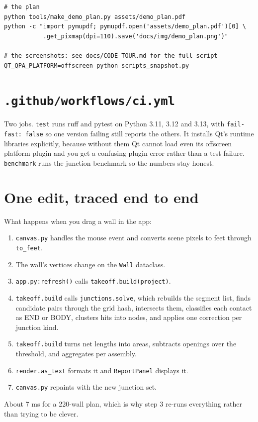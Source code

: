 \documentclass[11pt,letterpaper]{article}
\newcommand{\code}[1]{\texttt{\small #1}}
\begin{document}
\begin{lstlisting}[language=none]
# the plan
python tools/make_demo_plan.py assets/demo_plan.pdf
python -c "import pymupdf; pymupdf.open('assets/demo_plan.pdf')[0] \
           .get_pixmap(dpi=110).save('docs/img/demo_plan.png')"

# the screenshots: see docs/CODE-TOUR.md for the full script
QT_QPA_PLATFORM=offscreen python scripts_snapshot.py
\end{lstlisting}

\section{\texttt{.github/workflows/ci.yml}}

Two jobs. \code{test} runs ruff and pytest on Python 3.11, 3.12 and 3.13,
with \code{fail-fast: false} so one version failing still reports the
others. It installs Qt's runtime libraries explicitly, because without them
Qt cannot load even its offscreen platform plugin and you get a confusing
plugin error rather than a test failure. \code{benchmark} runs the junction
benchmark so the numbers stay honest.

\section{One edit, traced end to end}

What happens when you drag a wall in the app:

\begin{enumerate}
  \item \code{canvas.py} handles the mouse event and converts scene pixels
    to feet through \code{to\_feet}.
  \item The wall's vertices change on the \code{Wall} dataclass.
  \item \code{app.py:refresh()} calls \code{takeoff.build(project)}.
  \item \code{takeoff.build} calls \code{junctions.solve}, which rebuilds the
    segment list, finds candidate pairs through the grid hash, intersects
    them, classifies each contact as END or BODY, clusters hits into nodes,
    and applies one correction per junction kind.
  \item \code{takeoff.build} turns net lengths into areas, subtracts
    openings over the threshold, and aggregates per assembly.
  \item \code{render.as\_text} formats it and \code{ReportPanel} displays it.
  \item \code{canvas.py} repaints with the new junction set.
\end{enumerate}

About 7 ms for a 220-wall plan, which is why step 3 re-runs everything
rather than trying to be clever.
\end{document}
